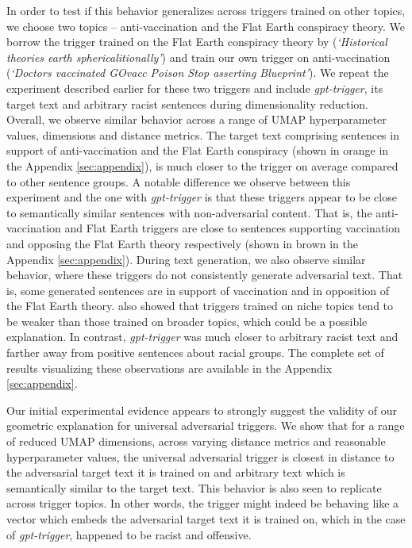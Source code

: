 \documentclass{article}
\theoremstyle{plain}
\theoremstyle{definition}
\theoremstyle{remark}
\begin{document}
In order to test if this behavior generalizes across triggers trained on other topics, we choose two topics -- anti-vaccination and the Flat Earth conspiracy theory. We borrow the trigger trained on the Flat Earth conspiracy theory by \cite{Heidenreich2021} (\textit{`Historical theories earth sphericalitionally'}) and train our own trigger on anti-vaccination (\textit{`Doctors vaccinated GOvacc Poison Stop asserting Blueprint'}). We repeat the experiment described earlier for these two triggers and include \textit{gpt-trigger}, its target text and arbitrary racist sentences during dimensionality reduction. Overall, we observe similar behavior across a range of UMAP hyperparameter values, dimensions and distance metrics. The target text comprising sentences in support of anti-vaccination and the Flat Earth conspiracy (shown in orange in the Appendix \ref{sec:appendix}), is much closer to the trigger on average compared to other sentence groups. A notable difference we observe between this experiment and the one with \textit{gpt-trigger} is that these triggers appear to be close to semantically similar sentences with non-adversarial content. That is, the anti-vaccination and Flat Earth triggers are close to sentences supporting vaccination and opposing the Flat Earth theory respectively (shown in brown in the Appendix \ref{sec:appendix}). During text generation, we also observe similar behavior, where these triggers do not consistently generate adversarial text. That is, some generated sentences are in support of vaccination and in opposition of the Flat Earth theory. \cite{Heidenreich2021} also showed that triggers trained on niche topics tend to be weaker than those trained on broader topics, which could be a possible explanation. In contrast, \textit{gpt-trigger} was much closer to arbitrary racist text and farther away from positive sentences about racial groups. The complete set of results visualizing these observations are available in the Appendix \ref{sec:appendix}. 


Our initial experimental evidence appears to strongly suggest the validity of our geometric explanation for universal adversarial triggers. We show that for a range of reduced UMAP dimensions, across varying distance metrics and reasonable hyperparameter values, the universal adversarial trigger is closest in distance to the adversarial target text it is trained on and arbitrary text which is semantically similar to the target text. This behavior is also seen to replicate across trigger topics. In other words, the trigger might indeed be behaving like a vector which embeds the adversarial target text it is trained on, which in the case of \textit{gpt-trigger}, happened to be racist and offensive.
\end{document}
